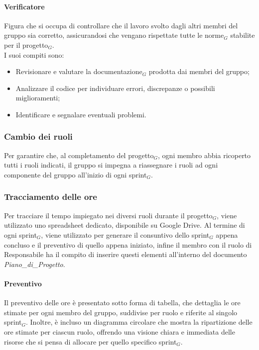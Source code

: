 \documentclass[10pt]{article}
\begin{document}
\begin{justify}
        \paragraph{Verificatore}
        Figura che si occupa di controllare che il lavoro svolto dagli altri membri del gruppo sia corretto, assicurandosi che vengano rispettate tutte le norme$_G$ stabilite per il progetto$_G$.\\
        I suoi compiti sono:
        \begin{itemize}
            \item Revisionare e valutare la documentazione$_G$ prodotta dai membri del gruppo;
            \item Analizzare il codice per individuare errori, discrepanze o possibili miglioramenti;
            \item Identificare e segnalare eventuali problemi.
        \end{itemize}

    \subsubsection{Cambio dei ruoli}
    Per garantire che, al completamento del progetto$_G$, ogni membro abbia ricoperto tutti i ruoli indicati, il gruppo si impegna a riassegnare i ruoli ad ogni componente del gruppo all'inizio di ogni sprint$_G$.

    \subsubsection{Tracciamento delle ore}
    Per tracciare il tempo impiegato nei diversi ruoli durante il progetto$_G$, viene utilizzato uno spreadsheet dedicato, disponibile su Google Drive. Al termine di ogni sprint$_G$, viene utilizzato per generare il consuntivo dello sprint$_G$ appena concluso e il preventivo di quello appena iniziato, infine il membro con il ruolo di Responsabile ha il compito di inserire questi elementi all'interno del documento \textit{Piano\_di\_Progetto}.

        \paragraph{Preventivo}
        Il preventivo delle ore è presentato sotto forma di tabella, che dettaglia le ore stimate per ogni membro del gruppo, suddivise per ruolo e riferite al singolo sprint$_G$. Inoltre, è incluso un diagramma circolare che mostra la ripartizione delle ore stimate per ciascun ruolo, offrendo una visione chiara e immediata delle risorse che si pensa di allocare per quello specifico sprint$_G$.


\end{justify}
\end{document}
